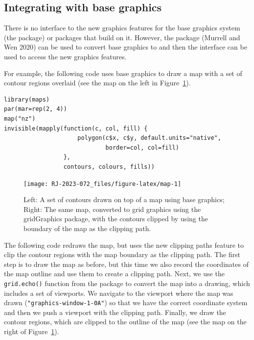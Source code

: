 \hypertarget{integrating-with-base-graphics}{%
\subsection{Integrating with base graphics}\label{integrating-with-base-graphics}}

There is no interface to the new graphics features for
the base graphics system (the  package) or packages
that build on it. However, the
 package (Murrell and Wen 2020)
can be used to convert base graphics to 
and then the  interface can be used to access the
new graphics features.

For example, the following code uses base graphics to draw a map
with a set of contour regions overlaid
(see the map on the left in Figure~\ref{fig:map}).

\begin{verbatim}
library(maps)
par(mar=rep(2, 4))
map("nz")
invisible(mapply(function(c, col, fill) {
                     polygon(c$x, c$y, default.units="native", 
                             border=col, col=fill)
                 },
                 contours, colours, fills))
\end{verbatim}

\begin{figure}[h]
\texttt{[image: RJ-2023-072\_files/figure-latex/map-1]} \caption{Left:  A set of contours drawn on top of a map using base graphics;  Right: The same map, converted to grid graphics using the gridGraphics package, with the contours clipped by using the boundary of the map as the clipping path.}\label{fig:map}
\end{figure}

The following code redraws the map, but
uses the new clipping paths feature to clip the
contour regions with the map boundary as the clipping path.
The first step is to draw the map as before, but this time we also
record the coordinates of the map outline and use them to create
a clipping path.
Next, we use the \texttt{grid.echo()} function from the  package
to convert the map into a  drawing, which includes a set
of  viewports.
We navigate to the viewport where the map was drawn
(\texttt{"graphics-window-1-0A"}) so that we have the correct coordinate
system and then we push a viewport with the clipping path.
Finally, we draw the contour regions, which are clipped
to the outline of the map (see the map on the right of
Figure~\ref{fig:map}).

